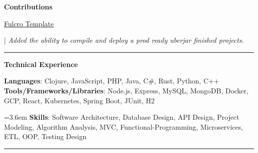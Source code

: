 \documentclass[letterpaper,11pt]{article}
\begin{document}
\textbf{\large \textcolor{magic_blue}{Contributions}}

\begin{minipage}[t]{0.1 \textwidth}
	\raggedright
	\href{https://github.com/fulcrologic/fulcro-template}{\underline{Fulcro Template}}
\end{minipage}
\hfill
\begin{minipage}[t]{0.8\textwidth}
	\raggedright
	|\textit{ Added the ability to compile and deploy a prod ready uberjar finished projects. } \\
\end{minipage}

\noindent\rule{19.5cm}{0.4pt}

%
\textbf{\large \textcolor{magic_blue}{Technical Experience} }
\begin{onehalfspace}

	\textbf{ Languages}{: Clojure, JavaScript, PHP, Java, C\#, Rust, Python, C++ } \\

	\textbf{ Tools/Frameworks/Libraries}{: Node.js, Express, MySQL, MongoDB, Docker, GCP, React, Kubernetes, Spring Boot, JUnit, H2 } \\
\end{onehalfspace}

\hangindent=3.6em
\textbf{ Skills}{: }
Software Architecture, Database Design, API Design, Project Modeling, Algorithm Analysis,
MVC, Functional-Programming, Microservices, ETL, OOP, Testing Design

\noindent\rule{19.5cm}{0.4pt}

\end{document}
